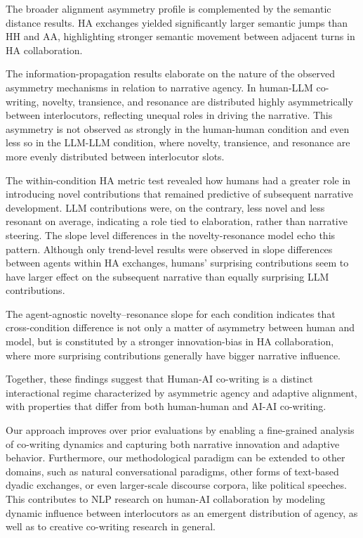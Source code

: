 \documentclass[11pt]{article}
\begin{document}
The broader alignment asymmetry profile is complemented by the semantic distance results. HA exchanges yielded significantly larger semantic jumps than HH and AA, highlighting stronger semantic movement between adjacent turns in HA collaboration.  

The information-propagation results elaborate on the nature of the observed asymmetry mechanisms in relation to narrative agency. In human-LLM co-writing, novelty, transience, and resonance are distributed highly asymmetrically between interlocutors, reflecting unequal roles in driving the narrative. This asymmetry is not observed as strongly in the human-human condition and even less so in the LLM-LLM condition, where novelty, transience, and resonance are more evenly distributed between interlocutor slots. 

The within-condition HA metric test revealed how humans had a greater role in introducing novel contributions that remained predictive of subsequent narrative development. LLM contributions were, on the contrary, less novel and less resonant on average, indicating a role tied to elaboration, rather than narrative steering. The slope level differences in the novelty-resonance model echo this pattern. Although only trend-level results were observed in slope differences between agents within HA exchanges, humans' surprising contributions seem to have larger effect on the subsequent narrative than equally surprising LLM contributions. 

The agent-agnostic novelty--resonance slope for each condition indicates that cross-condition difference is not only a matter of asymmetry between human and model, but is constituted by a stronger innovation-bias in HA collaboration, where more surprising contributions generally have bigger narrative influence. 

Together, these findings suggest that Human-AI co-writing is a distinct interactional regime characterized by asymmetric agency and adaptive alignment, with properties that differ from both human-human and AI-AI co-writing. 

Our approach improves over prior evaluations by enabling a fine-grained analysis of co-writing dynamics and capturing both narrative innovation and adaptive behavior. Furthermore, our methodological paradigm can be extended to other domains, such as natural conversational paradigms, other forms of text-based dyadic exchanges, or even larger-scale discourse corpora, like political speeches. This contributes to NLP research on human-AI collaboration by modeling dynamic influence between interlocutors as an emergent distribution of agency, as well as to creative co-writing research in general.
\end{document}
